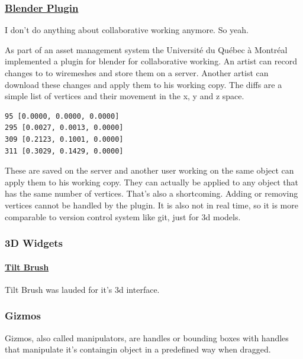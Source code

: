 \subsubsection{\texorpdfstring{\href{http://www.researchgate.net/publication/221610780_A_Blender_Plugin_for_Collaborative_Work_on_the_Articiel_Platform}{Blender
Plugin}}{Blender Plugin}}\label{blender-plugin10}

I don't do anything about collaborative working anymore. So yeah.

As part of an asset management system the Université du Québec à
Montréal implemented a plugin for blender for collaborative working. An
artist can record changes to to wiremeshes and store them on a server.
Another artist can download these changes and apply them to his working
copy. The diffs are a simple list of vertices and their movement in the
x, y and z space.

\begin{verbatim}
95 [0.0000, 0.0000, 0.0000]
295 [0.0027, 0.0013, 0.0000]
309 [0.2123, 0.1001, 0.0000]
311 [0.3029, 0.1429, 0.0000]
\end{verbatim}

These are saved on the server and another user working on the same
object can apply them to his working copy. They can actually be applied
to any object that has the same number of vertices. That's also a
shortcoming. Adding or removing vertices cannot be handled by the
plugin. It is also not in real time, so it is more comparable to version
control system like git, just for 3d models.

\subsubsection{3D Widgets}\label{d-widgets}

\paragraph{\texorpdfstring{\href{http://www.tiltbrush.com/}{Tilt
Brush}}{Tilt Brush}}\label{tilt-brush20}

Tilt Brush was lauded for it's 3d interface.

\subsubsection{Gizmos}\label{gizmos}

Gizmos, also called manipulators, are handles or bounding boxes with
handles that manipulate it's containgin object in a predefined way when
dragged. \cite{gizmo}


